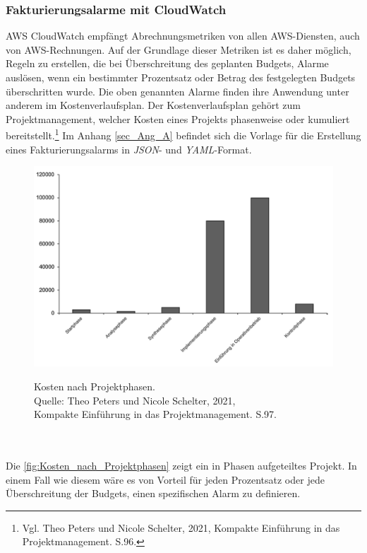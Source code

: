 \subsubsection*{Fakturierungsalarme mit CloudWatch}
AWS CloudWatch empfängt Abrechnungsmetriken von allen AWS-Diensten, auch von AWS-Rechnungen. Auf der Grundlage dieser Metriken ist es daher möglich, Regeln zu erstellen, die bei Überschreitung des geplanten Budgets, Alarme auslösen, wenn ein bestimmter Prozentsatz oder Betrag des festgelegten Budgets überschritten wurde. Die oben genannten Alarme finden ihre Anwendung unter anderem im Kostenverlaufsplan. Der Kostenverlaufsplan gehört zum Projektmanagement, welcher Kosten eines Projekts phasenweise oder kumuliert bereitstellt.\footnote{Vgl. Theo Peters und Nicole Schelter, 2021, Kompakte Einführung in das Projektmanagement. S.96\cite{PM1}.} Im Anhang \ref{sec_Ang_A} befindet sich die Vorlage für die Erstellung eines Fakturierungsalarms in \textit{JSON}- und \textit{YAML}-Format.
\begin{figure}[h!]
  \centering
  \includegraphics[scale=0.45]{sources/Kosten_nach_Projektphasen}
  \caption[Kosten nach Projektphasen]{}
  \label{fig:Kosten_nach_Projektphasen} 
  Kosten nach Projektphasen.\\
  Quelle: Theo Peters und Nicole Schelter, 2021, \\
  Kompakte Einführung in das Projektmanagement. S.97\cite{PM1}.
\end{figure}
\\\\
Die \autoref{fig:Kosten_nach_Projektphasen} zeigt ein in Phasen aufgeteiltes Projekt. In einem Fall wie diesem wäre es von Vorteil für jeden Prozentsatz oder jede Überschreitung der Budgets, einen spezifischen Alarm zu definieren.
